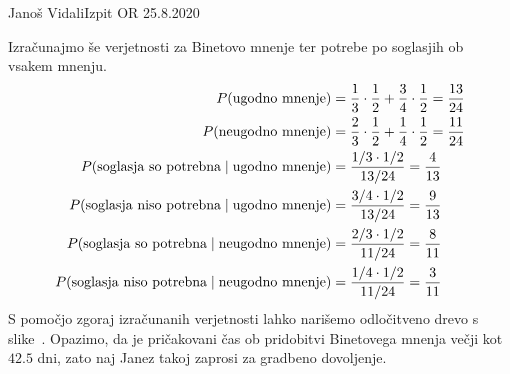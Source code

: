 \begin{naloga}{Janoš Vidali}{Izpit OR 25.8.2020}
\begin{odgovor}
Izračunajmo še verjetnosti za Binetovo mnenje
ter potrebe po soglasjih ob vsakem mnenju.
\begin{align*}
P(\text{ugodno mnenje}) &=
{1 \over 3} \cdot {1 \over 2} + {3 \over 4} \cdot {1 \over 2} = {13 \over 24} \\
P(\text{neugodno mnenje}) &=
{2 \over 3} \cdot {1 \over 2} + {1 \over 4} \cdot {1 \over 2} = {11 \over 24} \\
P(\text{soglasja so potrebna} \mid \text{ugodno mnenje})
&= {1/3 \cdot 1/2 \over 13/24} = {4 \over 13} \\
P(\text{soglasja niso potrebna} \mid \text{ugodno mnenje})
&= {3/4 \cdot 1/2 \over 13/24} = {9 \over 13} \\
P(\text{soglasja so potrebna} \mid \text{neugodno mnenje})
&= {2/3 \cdot 1/2 \over 11/24} = {8 \over 11} \\
P(\text{soglasja niso potrebna} \mid \text{neugodno mnenje})
&= {1/4 \cdot 1/2 \over 11/24} = {3 \over 11}
\end{align*}
S pomočjo zgoraj izračunanih verjetnosti
lahko narišemo odločitveno drevo s slike~\fig.
Opazimo,
da je pričakovani čas ob pridobitvi Binetovega mnenja večji kot $42.5$ dni,
zato naj Janez takoj zaprosi za gradbeno dovoljenje.

\begin{slika}
\makebox[\textwidth][c]{
\pgfslika
}
\end{slika}
\end{odgovor}
\end{naloga}
